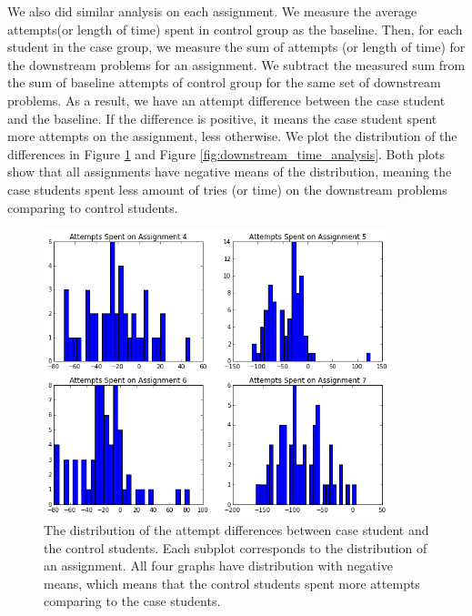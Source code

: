 \documentclass{llncs2e/llncs}
\begin{document}
We also did similar analysis on each assignment. We measure the average attempts(or length of time) spent in control group as the baseline. Then, for each student in the case group, we measure the sum of attempts (or length of time) for the downstream problems for an assignment. We subtract the measured sum from the sum of baseline attempts of control group for the same set of downstream problems. As a result, we have an attempt difference between the case student and the baseline. If the difference is positive, it means the case student spent more attempts on the assignment, less otherwise. We plot the distribution of the differences in Figure \ref{fig:downstream_tries_analysis} and Figure \ref{fig:downstream_time_analysis}. Both plots show that all assignments have negative means of the distribution, meaning the case students spent less amount of tries (or time) on the downstream problems comparing to control students.

\begin{figure}[ht]
\centering
\includegraphics[width=0.9\textwidth]{image/assignment_tries_downstream.png}
\caption{The distribution of the attempt differences between case student and the control students. Each subplot corresponds to the distribution of an assignment. All four graphs have distribution with negative means, which means that the control students spent more attempts comparing to the case students.}
    \label{fig:downstream_tries_analysis}
\end{figure}
\end{document}
